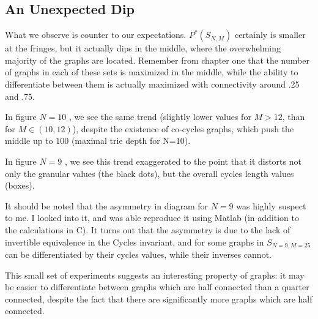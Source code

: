 \subsection{An Unexpected Dip}

What we observe is counter to our expectations.
$P^*(S_{N, M})$ certainly is smaller at the fringes, but it actually dips in the middle, where the overwhelming majority of the graphs are located.
Remember from chapter one that the number of graphs in each of these sets is maximized in the middle, while the ability to differentiate between them is actually maximized with connectivity around .25 and .75.

In figure $N=10$ , we see the same trend (slightly lower values for $M > 12$, than for $M \in (10, 12)$), despite the existence of co-cycles graphs, which push the middle up to 100 (maximal trie depth for N=10).

In figure $N=9$ , we see this trend exaggerated to the point that it distorts not only the granular values (the black dots), but the overall cycles length values (boxes).

It should be noted that the asymmetry in diagram for $N=9$ was highly suspect to me.
I looked into it, and was able reproduce it using Matlab (in addition to the calculations in C).  
It turns out that the asymmetry is due to the lack of invertible equivalence in the Cycles invariant, and for some graphs in $S_{N=9, M=25}$ can be differentiated by their cycles values, while their inverses cannot.

This small set of experiments suggests an interesting property of graphs: it may be easier to differentiate between graphs which are half connected than a quarter connected, despite the fact that there are significantly more graphs which are half connected.
